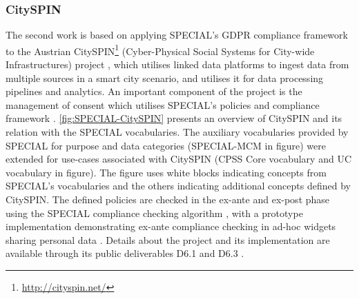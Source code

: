 

\subsubsection{CitySPIN}
The second work is based on applying SPECIAL's GDPR compliance framework to the Austrian CitySPIN\footnote{\url{http://cityspin.net/}} (Cyber-Physical Social Systems for City-wide Infrastructures) project \cite{fernandez_user_2019}, which utilises linked data platforms to ingest data from multiple sources in a smart city scenario, and utilises it for data processing pipelines and analytics. An important component of the project is the management of consent which utilises SPECIAL's policies \cite{bonatti_special_2018-1,bonatti_special_2018-2} and compliance framework \cite{kirrane_scalable_2018}.
\autoref{fig:SPECIAL-CitySPIN} presents an overview of CitySPIN and its relation with the SPECIAL vocabularies. The auxiliary vocabularies provided by SPECIAL for purpose and data categories (SPECIAL-MCM in figure) were extended for use-cases associated with CitySPIN (CPSS Core vocabulary and UC vocabulary in figure).
The figure uses white blocks indicating concepts from SPECIAL's vocabularies and the others indicating additional concepts defined by CitySPIN.
The defined policies are checked in the ex-ante and ex-post phase using the SPECIAL compliance checking algorithm \cite{bonatti_fast_2018,bonatti_richer_2019}, with a prototype implementation demonstrating ex-ante compliance checking in ad-hoc widgets sharing personal data \cite{fernandez_privacy-aware_2019}. Details about the project and its implementation are available through its public deliverables D6.1 \cite{noauthor_d6.1_2018} and D6.3 \cite{noauthor_d6.3_2019}.
